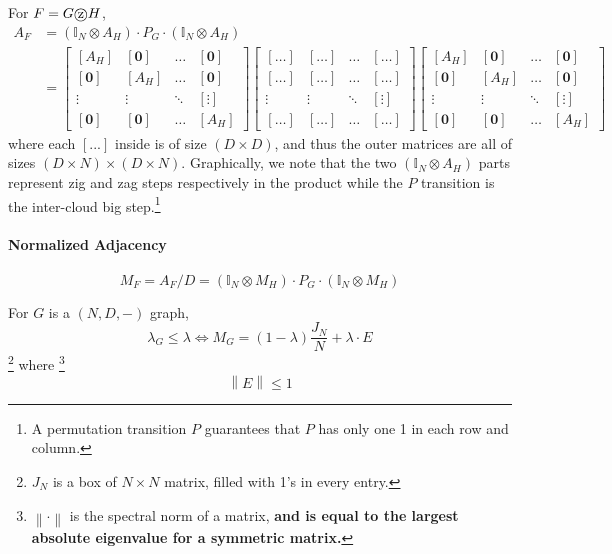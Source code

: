 \documentclass[11pt, letter]{book}
\newcommand{\bzero}{\mathbf{0}}
\newcommand{\norm}[1]{\left\lVert#1\right\rVert}
\newcommand*\tcircle[1]{%
  \raisebox{-0.5pt}{%
    \textcircled{#1}%
  }%
}
\begin{document}
\begin{proposition}
\label{prop:adjacency of zig zag product}
	For $F = G \tcircle {z} H$, 
	\begin{align}
		A_F 
		&= (\mathbb I _N \otimes A_H ) \cdot P_G \cdot ( \mathbb I _ N \otimes A_H ) \\
		&= \begin{bmatrix}
			[A_H] & [\bzero] & \dots & [\bzero] \\
			[\bzero] & [A_H] & \dots  & [\bzero] \\
			\vdots & \vdots & \ddots & [\vdots] \\
			[\bzero] & [\bzero] & \dots & [A_H]
		\end{bmatrix} \begin{bmatrix}
			[\dots] & [\dots] & \dots & [\dots] \\
			[\dots] & [\dots] & \dots  & [\dots] \\
			\vdots & \vdots & \ddots & [\vdots] \\
			[\dots] & [\dots] & \dots & [\dots]
		\end{bmatrix} \begin{bmatrix}
			[A_H] & [\bzero] & \dots & [\bzero] \\
			[\bzero] & [A_H] & \dots  & [\bzero] \\
			\vdots & \vdots & \ddots & [\vdots] \\
			[\bzero] & [\bzero] & \dots & [A_H]
		\end{bmatrix}
	\end{align}
	where each $[...]$ inside is of size $( D \times D)$, and thus the outer matrices are all of sizes $(D \times N) \times (D \times N )$. Graphically, we note that the two $(\mathbb I _N \otimes A_H )$ parts represent zig and zag steps respectively in the product while the $P$ transition is the inter-cloud big step.\footnote{A permutation transition $P$ guarantees that $P$ has only one 1 in each row and column. } 
	
	\paragraph{Normalized Adjacency}
	\begin{equation}
		M_F = A_F / D = (\mathbb I _N \otimes M_H ) \cdot P_G \cdot ( \mathbb I _ N \otimes M_H )
	\end{equation}
\end{proposition}

\begin{lemma}
	\label{lemma: zig zag la 1}
	For $G$ is a $(N, D, -)$ graph, 
	\begin{equation}
		\lambda_G \leq \lambda \iff M_G = (1 - \lambda) \frac{J_N}{N} + \lambda \cdot E
	\end{equation}\footnote{$J_N$ is a box of $N \times N$ matrix, filled with 1's in every entry.}
	where \footnote{$\norm{ \cdot }$ is the spectral norm of a matrix, \textbf{and is equal to the largest absolute eigenvalue for a symmetric matrix.} }
	\begin{equation}
		\norm{ E } \leq 1
	\end{equation}
\end{lemma}
\end{document}
